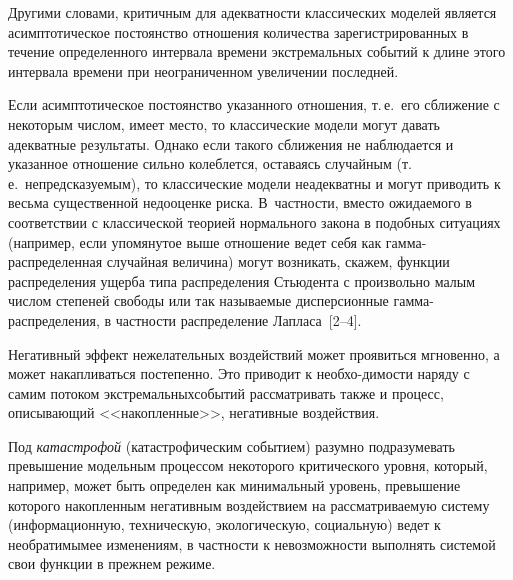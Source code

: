 \begin{multicols}{2}
Другими словами, критичным для адекват\-ности
классических моделей является асимптотическое постоянство отношения
количества зарегистрированных в течение определенного интервала
времени экстремальных событий к длине этого интервала времени при
неограниченном увеличении по\-следней. 

Если асимптотическое
постоянство указанного отношения, т.\,е.\ его сближение с некоторым
чис\-лом, имеет место, то классические модели могут давать адекватные
результаты. Однако если такого сближения не наблюдается и указанное
отношение сильно колеблется, оставаясь случайным (т.\,е.\
непредсказуемым), то классические модели неадекватны и могут
приводить к весьма существенной недооценке риска. В~частности,
вместо ожидаемого в соответствии с классической теорией нормального
закона в подобных ситуациях (например, если упомянутое выше
отношение ведет себя как гам\-ма-рас\-пре\-де\-лен\-ная случайная величина)
могут возникать, скажем, функции распределения ущерба типа
распределения Стьюдента с произвольно малым числом степеней свободы
или так называемые дисперсионные гам\-ма-рас\-пре\-де\-ле\-ния, в част\-ности
распределение Лапласа~[2--4].

Негативный эффект нежелательных воздействий может проявиться
мгновенно, а может накапливаться постепенно. Это приводит к
не\-обхо-\linebreak ди\-мости наряду с самим потоком экстремальных\linebreak событий
рассматривать также и процесс, описывающий <<накопленные>>,
негативные воздействия. 

Под {\it катастрофой} (катастрофическим
событием) разумно подразумевать превышение модельным процессом
некоторого критического уровня, который, например, может быть
определен как минимальный уровень, превышение которого накопленным
негативным воздействием на рассматриваемую систему (информационную,
техническую, экологическую, социальную) ведет к необратимым\linebreak ее
изменениям, в частности к невозможности выполнять системой свои
функции в прежнем ре\-жиме.


\end{multicols}

